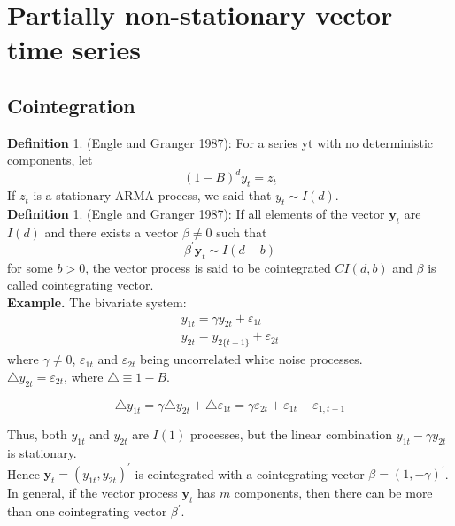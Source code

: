\documentclass{article}
\begin{document}
\section{Partially non-stationary vector time series}
\subsection{Cointegration}
\textbf{Definition} 1. (Engle and Granger 1987): For a series yt with no deterministic components, let
\begin{equation*}
(1-B)^{d} y_{t}=z_{t}
\end{equation*}
If $z_t$ is a stationary ARMA process, we said that $y_t \sim I(d)$.\\

\noindent \textbf{Definition} 1. (Engle and Granger 1987): If all elements of the vector $\mathbf{y}_t$ are $I(d)$ and there exists a vector $\beta \neq 0$ such that
\begin{equation*}
\beta^{\prime} \mathbf{y}_{t} \sim I(d-b)
\end{equation*}
for some $b > 0$, the vector process is said to be cointegrated $CI(d,b)$ and $\beta$ is called cointegrating vector.\\

\noindent \textbf{Example.} The bivariate system:
\begin{equation*}
\begin{array}{l}{y_{1 t}=\gamma y_{2 t}+\varepsilon_{1 t}} \\ {y_{2 t}=y_{2\{t-1\}}+\varepsilon_{2 t}}\end{array}
\end{equation*}
where $\gamma \neq 0$, $\varepsilon_{1 t}$ and $\varepsilon_{2 t}$ being uncorrelated white noise processes.\\

\noindent $\triangle y_{2 t}=\varepsilon_{2 t}$, where $\triangle \equiv 1-B$.

\begin{equation*}
\triangle y_{1 t}=\gamma \triangle y_{2 t}+\triangle \varepsilon_{1 t}=\gamma \varepsilon_{2 t}+\varepsilon_{1 t}-\varepsilon_{1, t-1}
\end{equation*}

\noindent Thus, both $y_{1 t}$ and $y_{2 t}$ are $I(1)$ processes, but the linear combination $y_{1 t}-\gamma y_{2 t}$ is stationary.\\

\noindent Hence $\mathbf{y}_{t}=\left(y_{1 t}, y_{2 t}\right)^{\prime}$ is cointegrated with a cointegrating vector $\beta = (1, -\gamma)^{\prime}$.\\

\noindent In general, if the vector process $\mathbf{y}_{t}$ has $m$ components, then there can be
more than one cointegrating vector $\beta^{\prime}$.
\end{document}
